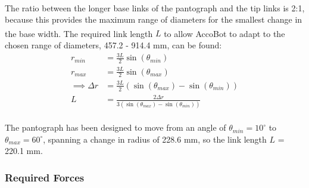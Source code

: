 \documentclass[11pt]{article}		%
\newcommand{\supercite}[1]{\textsuperscript{\cite{#1}}}		%
\begin{document}
    			\\
                \hspace*{2ex}The ratio between the longer base links of the pantograph and the tip links is 2:1, because this provides the maximum range of diameters for the smallest change in the base width\supercite{okada1987mogrer}.
				The required link length $L$ to allow AccoBot to adapt to the chosen range of diameters, 457.2 - 914.4 mm, can be found:
				\begin{align}
					r_{min} &= \frac{3L}{2} \sin \left( \theta_{min} \right) \label{rMin}
					\\
					r_{max} &= \frac{3L}{2} \sin \left( \theta_{max} \right)
					\\
					\implies \Delta r &= \frac{3L}{2} \left( \sin \left( \theta_{max} \right) - \sin \left( \theta_{min} \right) \right)
					\\
					L &= \frac{2 \Delta r}{3 \left( \sin \left( \theta_{max} \right) - \sin \left( \theta_{min} \right) \right)}
				\end{align}
				\\
                \hspace*{2ex}The pantograph has been designed to move from an angle of $\theta_{min} = 10^\circ$ to $\theta_{max} = 60^\circ$, spanning a change in radius of 228.6 mm, so the link length $L$ = 220.1 mm.
			
			\subsubsection{Required Forces} \label{requiredForce}
			
\end{document}
